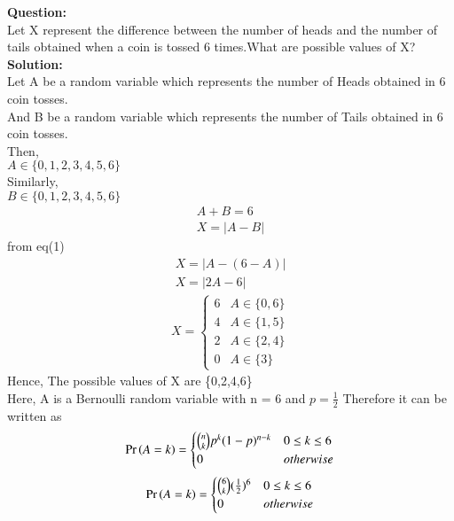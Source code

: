 \documentclass[journal,12pt,twocolumn]{IEEEtran}
\begin{document}
\textbf{Question:}\\
 	Let X represent the difference between the number of heads and the number of tails obtained when a coin is tossed 6 times.What are possible values of X?
\\
 \textbf{Solution:}
 \\
 Let A be a random variable which represents the number of Heads obtained in 6 coin tosses.
 \\And B be a random variable which represents the number of Tails obtained in 6 coin tosses.
 \\Then,
 \\ $A \in \{0,1,2,3,4,5,6\}$
 \\Similarly,
 \\ $B \in \{0,1,2,3,4,5,6\}$
\begin{align}
    A + B = 6\\
    X = |A -B|
    \end{align}
from eq(1)
\begin{align}
    X = |A -(6-A)|\\
    X = |2A -6|
    \end{align}
\begin{align}
        X = 
        \begin{cases}
            6 & A \in \{0,6\} \\
            4 & A \in \{1,5\}\\
            2 & A \in \{2,4\}\\
            0 & A \in \{3\}
        \end{cases}
    \end{align}
Hence, The possible values of X are \{0,2,4,6\}
\\Here, A is a Bernoulli random variable with n = 6 and $p=\frac{1}{2}$
Therefore it can be written as
\begin{align}
        \Pr\left(A=k\right) = 
        \begin{cases}
            \binom{n}{k} p^{k} (1-p)^{n-k} & 0\leq k \leq 6\\
            0 & otherwise
        \end{cases}
    \end{align}
\begin{align}
        \Pr\left(A=k\right) = 
        \begin{cases}
            \binom{6}{k} (\frac{1}{2})^6 & 0\leq k \leq 6\\
            0 & otherwise
        \end{cases}
    \end{align}
\end{document}
